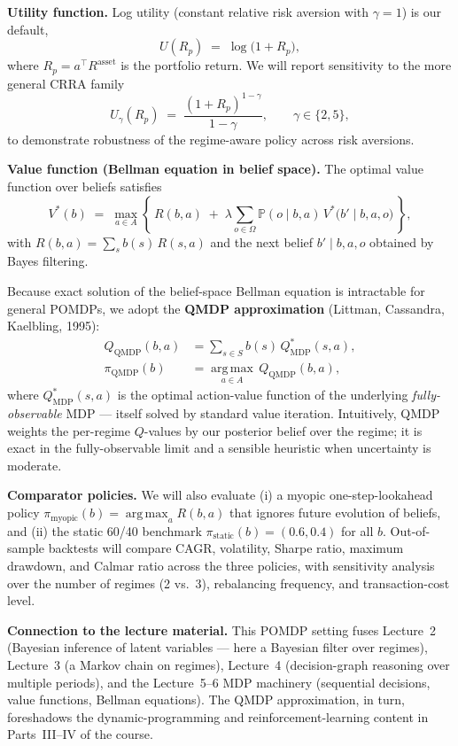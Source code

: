 \documentclass[12pt]{article}
\newcommand{\Prb}{\mathbb{P}}
\newcommand{\argmax}{\operatorname*{arg\,max}}
\begin{document}
\textbf{Utility function.} Log utility (constant relative risk aversion with $\gamma = 1$) is our default,
\[
  U(R_p) \;=\; \log\!\big(1 + R_p\big),
\]
where $R_p = a^\top R^{\text{asset}}$ is the portfolio return. We will report sensitivity to the more general CRRA family
\[
  U_\gamma(R_p) \;=\; \frac{(1 + R_p)^{1-\gamma}}{1 - \gamma}, \qquad \gamma \in \{2, 5\},
\]
to demonstrate robustness of the regime-aware policy across risk aversions.

\textbf{Value function (Bellman equation in belief space).} The optimal value function over beliefs satisfies
\[
  V^*(b) \;=\; \max_{a \in A}\!\left\{\, R(b, a) \;+\; \lambda \sum_{o \in \Omega} \Prb(o \mid b, a)\, V^*\!\big(b' \mid b, a, o\big) \,\right\},
\]
with $R(b, a) = \sum_{s} b(s)\, R(s, a)$ and the next belief $b' \mid b, a, o$ obtained by Bayes filtering.

Because exact solution of the belief-space Bellman equation is intractable for general POMDPs, we adopt the \textbf{QMDP approximation} (Littman, Cassandra, Kaelbling, 1995):
\begin{align*}
  Q_{\text{QMDP}}(b, a) &= \sum_{s \in S} b(s)\, Q^*_{\text{MDP}}(s, a), \\
  \pi_{\text{QMDP}}(b)  &= \argmax_{a \in A}\, Q_{\text{QMDP}}(b, a),
\end{align*}
where $Q^*_{\text{MDP}}(s, a)$ is the optimal action-value function of the underlying \emph{fully-observable} MDP --- itself solved by standard value iteration. Intuitively, QMDP weights the per-regime $Q$-values by our posterior belief over the regime; it is exact in the fully-observable limit and a sensible heuristic when uncertainty is moderate.

\textbf{Comparator policies.} We will also evaluate (i) a myopic one-step-lookahead policy $\pi_{\text{myopic}}(b) = \argmax_a R(b, a)$ that ignores future evolution of beliefs, and (ii) the static 60/40 benchmark $\pi_{\text{static}}(b) = (0.6, 0.4)$ for all $b$. Out-of-sample backtests will compare CAGR, volatility, Sharpe ratio, maximum drawdown, and Calmar ratio across the three policies, with sensitivity analysis over the number of regimes (2 vs.\ 3), rebalancing frequency, and transaction-cost level.

\textbf{Connection to the lecture material.} This POMDP setting fuses Lecture~2 (Bayesian inference of latent variables --- here a Bayesian filter over regimes), Lecture~3 (a Markov chain on regimes), Lecture~4 (decision-graph reasoning over multiple periods), and the Lecture~5--6 MDP machinery (sequential decisions, value functions, Bellman equations). The QMDP approximation, in turn, foreshadows the dynamic-programming and reinforcement-learning content in Parts~III--IV of the course.
\end{document}
